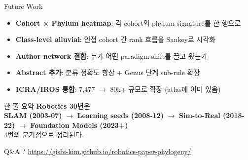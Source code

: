 \documentclass[aspectratio=169,t]{beamer}
\newcommand{\hot}[1]{\textcolor{accentorange}{\textbf{#1}}}
\newcommand{\cool}[1]{\textcolor{accentblue}{\textbf{#1}}}
\newcommand{\muted}[1]{\textcolor{mutedgray}{#1}}
\begin{document}
\begin{frame}{Future Work}
\begin{itemize}
  \item \cool{Cohort × Phylum heatmap}: 각 cohort의 phylum signature를 한 행으로
  \item \cool{Class-level alluvial}: 인접 cohort 간 rank 흐름을 Sankey로 시각화
  \item \cool{Author network 결합}: 누가 어떤 paradigm shift를 끌고 왔는가
  \item \cool{Abstract 추가}: 분류 정확도 향상 + Genus 단계 sub-rule 확장
  \item \cool{ICRA/IROS 통합}: 7,477 $\to$ 80k+ 규모로 확장 (atlas에 이미 있음)
\end{itemize}
\end{frame}

\begin{frame}{한 줄 요약}
\Large\centering
\vfill
\cool{Robotics 30년}은 \\[6pt]
\hot{SLAM (2003-07)} $\to$ \hot{Learning seeds (2008-12)} $\to$ \hot{Sim-to-Real (2018-22)} $\to$ \hot{Foundation Models (2023+)}\\[6pt]
\muted{4번의 분기점으로 정리된다.}
\vfill
\end{frame}

\begin{frame}{Q\&A}
\Huge\centering
?
\vfill
\normalsize
\url{https://gisbi-kim.github.io/robotics-paper-phylogeny/}
\end{frame}
\end{document}
